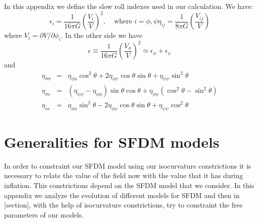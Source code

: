 \documentclass[twocolumn,           %
               showpacs,            %
               preprintnumbers,     %
               aps,                 %
               prl,          	    %
               letterpaper,             %
               superscriptaddress,      %
               nofootinbib,         %
               tightenlines,        %
               floats,floatfix      %
               ,usenatbib,
               ]{revtex4-1}
\begin{document}
In this appendix we define the slow roll indexes used in our calculation. We have:
\begin{subequations}
\begin{equation}
\epsilon_i = \frac{1}{16 \pi G}\left(\frac{V_i}{V}\right)^2, \ \ \ \ \ \text{where $i=\phi,\psi$}
\end{equation}
\begin{equation}
\eta_{ij}=\frac{1}{8\pi G}\left(\frac{V_{ij}}{V}\right)
\end{equation}
\end{subequations}
where $V_i = \partial V/\partial \phi_i$. In the other side we have
\begin{equation}
\epsilon \equiv \frac{1}{16\pi G}\left(\frac{V_\sigma}{V}\right)^2\simeq \epsilon_\phi+\epsilon_\psi
\end{equation}
and
\begin{eqnarray}
\eta_{\sigma\sigma}&=&\eta_{\phi\phi}\cos^2\theta + 2\eta_{\phi\psi}\cos\theta\sin\theta+\eta_{\psi\psi}\sin^2\theta\nonumber \\
\eta_{\sigma s}&=&(\eta_{\psi\psi}-\eta_{\phi\phi})\sin\theta\cos\theta + \eta_{\phi\psi}(\cos^2\theta-\sin^2\theta)\\
\eta_{ss}&=&\eta_{\phi\phi}\sin^2\theta - 2\eta_{\phi\psi}\cos\theta\sin\theta+\eta_{\psi\psi}\cos^2\theta\nonumber 
\end{eqnarray}
\section{Generalities for SFDM models}

In order to constraint our SFDM model using our isocurvature constrictions it is necessary to relate the value of the field now with the value that it has during inflation. This constrictions depend on the SFDM model that we consider. In this appendix we analyze the evolution of different models for SFDM and then in [section], with the help of isocurvature constrictions, try to constraint the free parameters of our models. 
\end{document}
